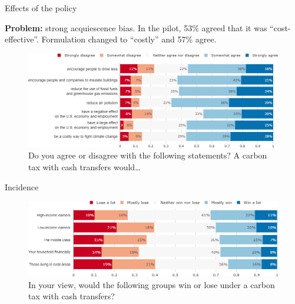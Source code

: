 \documentclass[aspectratio=169,9pt,dvipsnames]{beamer}
\begin{document}
\begin{frame}{Effects of the policy}%

\textbf{Problem:} strong acquiescence bias. In the pilot, 53\% agreed that it was ``cost-effective''. Formulation changed to ``costly'' and 57\% agree.

\begin{figure}[h!]
\centering
\caption{Do you agree or disagree with the following statements? A carbon tax with cash transfers would…}
\includegraphics[width=\textwidth]{../figures/US/tax_transfers_effect_US.png}
\end{figure}
\end{frame}

\begin{frame}{Incidence}%
\begin{figure}[h!]
\centering
\caption{In your view, would the following groups win or lose under a carbon tax with cash transfers?}
\includegraphics[width=\textwidth]{../figures/US/tax_transfers_win_lose_US.png}
\end{figure}
\end{frame}
\end{document}
